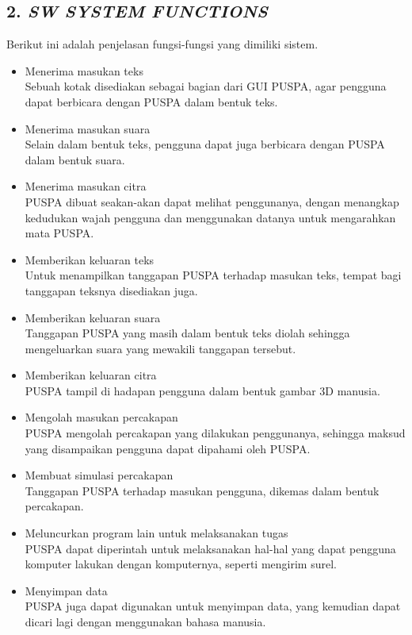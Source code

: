\subsection*{\textcolor{subsectioncolor}{\textsf{2. \textit{SW SYSTEM FUNCTIONS}}}}

Berikut ini adalah penjelasan fungsi-fungsi yang dimiliki sistem.
\begin{itemize}
\item Menerima masukan teks\\
  Sebuah kotak disediakan sebagai bagian dari GUI PUSPA,
  agar pengguna dapat berbicara dengan PUSPA dalam bentuk teks.
\item Menerima masukan suara\\
  Selain dalam bentuk teks, pengguna dapat juga berbicara dengan PUSPA dalam bentuk suara.
\item Menerima masukan citra\\
  PUSPA dibuat seakan-akan dapat melihat penggunanya,
  dengan menangkap kedudukan wajah pengguna dan menggunakan datanya untuk mengarahkan mata PUSPA.
\item Memberikan keluaran teks\\
  Untuk menampilkan tanggapan PUSPA terhadap masukan teks, tempat bagi tanggapan teksnya disediakan juga.
\item Memberikan keluaran suara\\
  Tanggapan PUSPA yang masih dalam bentuk teks diolah sehingga mengeluarkan suara yang mewakili tanggapan tersebut.
\item Memberikan keluaran citra\\
  PUSPA tampil di hadapan pengguna dalam bentuk gambar 3D manusia.
\item Mengolah masukan percakapan\\
  PUSPA mengolah percakapan yang dilakukan penggunanya, sehingga maksud yang disampaikan pengguna dapat dipahami oleh PUSPA.
\item Membuat simulasi percakapan\\
  Tanggapan PUSPA terhadap masukan pengguna, dikemas dalam bentuk percakapan.
\item Meluncurkan program lain untuk melaksanakan tugas\\
  PUSPA dapat diperintah untuk melaksanakan hal-hal yang dapat pengguna komputer lakukan dengan komputernya, seperti mengirim surel.
\item Menyimpan data\\
  PUSPA juga dapat digunakan untuk menyimpan data, yang kemudian dapat dicari lagi dengan menggunakan bahasa manusia.
\end{itemize}
